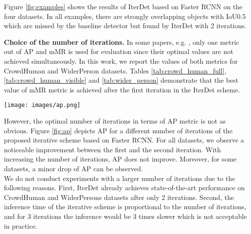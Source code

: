 \documentclass[runningheads]{llncs}
\begin{document}
Figure \ref{fig:examples} shows the results of IterDet based on Faster RCNN on the four datasets. In all examples, there are strongly overlapping objects with IoU0.5 which are missed by the baseline detector but found by IterDet with 2 iterations.

\textbf{Choice of the number of iterations.} In some papers, e.g. \cite{ge2020ps}, only one metric out of AP and mMR is used for evaluation since their optimal values are not achieved simultaneously. In this work, we report the values of both metrics for CrowdHuman and WiderPerson datasets. Tables \ref{tab:crowd_human_full}, \ref{tab:crowd_human_visible} and \ref{tab:wider_person} demonstrate that the best value of mMR metric is achieved after the first iteration in the IterDet scheme. 

\begin{figure*}[h!]
    \begin{center}
        \texttt{[image: images/ap.png]}
    \caption{AP for different number of iterations for IterDet based on Faster RCNN.}
    \label{fig:ap}
    \end{center}
\end{figure*}
However, the optimal number of iterations in terms of AP metric is not as obvious. Figure \ref{fig:ap} depicts AP for a different number of iterations of the proposed iterative scheme based on Faster RCNN. For all datasets, we observe a noticeable improvement between the first and the second iteration. With increasing the number of iterations, AP does not improve. Moreover, for some datasets, a minor drop of AP can be observed. \\

We do not conduct experiments with a larger number of iterations due to the following reasons. First, IterDet already achieves state-of-the-art performance on CrowdHuman and WiderPersons datasets after only 2 iterations. Second, the inference time of the iterative scheme is proportional to the number of iterations, and for 3 iterations the inference would be 3 times slower which is not acceptable in practice.
\end{document}

